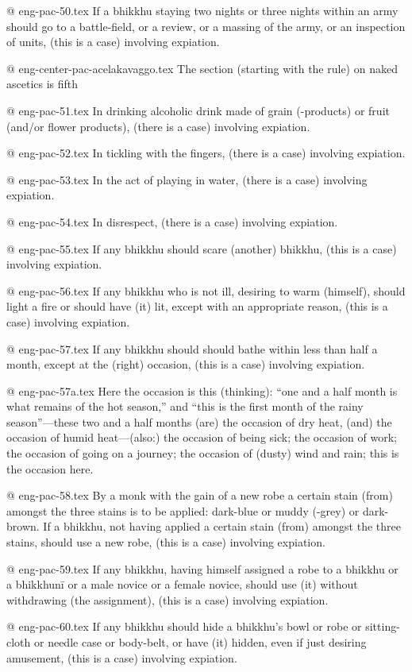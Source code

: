 @ eng-pac-50.tex
If a bhikkhu staying two nights or three nights within an army should go to a battle-field, or a review, or a massing of the army, or an inspection of units, (this is a case) involving expiation.

@ eng-center-pac-acelakavaggo.tex
The section (starting with the rule) on naked ascetics is fifth

@ eng-pac-51.tex
In drinking alcoholic drink made of grain (-products) or fruit (and/or flower products), (there is a case) involving expiation.

@ eng-pac-52.tex
In tickling with the fingers, (there is a case) involving expiation.

@ eng-pac-53.tex
In the act of playing in water, (there is a case) involving expiation.

@ eng-pac-54.tex
In disrespect, (there is a case) involving expiation.

@ eng-pac-55.tex
If any bhikkhu should scare (another) bhikkhu, (this is a case) involving expiation.

@ eng-pac-56.tex
If any bhikkhu who is not ill, desiring to warm (himself), should light a fire or should have (it) lit, except with an appropriate reason, (this is a case) involving expiation.

@ eng-pac-57.tex
If any bhikkhu should should bathe within less than half a month, except at the (right) occasion, (this is a case) involving expiation.

@ eng-pac-57a.tex
Here the occasion is this (thinking): “one and a half month is what remains of the hot season,” and “this is the first month of the rainy season”—these two and a half months (are) the occasion of dry heat, (and) the occasion of humid heat—(also:) the occasion of being sick; the occasion of work; the occasion of going on a journey; the occasion of (dusty) wind and rain; this is the occasion here.

@ eng-pac-58.tex
By a monk with the gain of a new robe a certain stain (from) amongst the three stains is to be applied: dark-blue or muddy (-grey) or dark-brown. If a bhikkhu, not having applied a certain stain (from) amongst the three stains, should use a new robe, (this is a case) involving expiation.

@ eng-pac-59.tex
If any bhikkhu, having himself assigned a robe to a bhikkhu or a bhikkhunī or a male novice or a female novice, should use (it) without withdrawing (the assignment), (this is a case) involving expiation.

@ eng-pac-60.tex
If any bhikkhu should hide a bhikkhu's bowl or robe or sitting-cloth or needle case or body-belt, or have (it) hidden, even if just desiring amusement, (this is a case) involving expiation.

